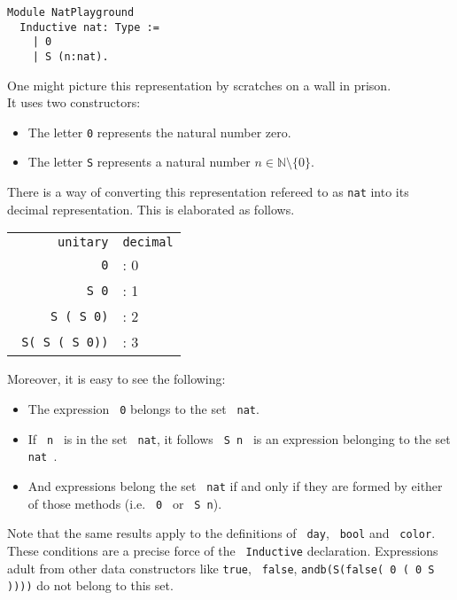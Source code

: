   \begin{lstlisting}[caption={\lstinline!nat!}, label=lst:DefNat]
  Module NatPlayground
  Inductive nat: Type :=
    | 0
    | S (n:nat).
  \end{lstlisting}  
  One might picture this representation by scratches on a wall in prison. \\
  It uses two constructors: 
  \begin{itemize}
  \item The letter \lstinline!0! represents the natural number zero. 
  \item The letter \lstinline!S! represents a natural number $n\in\mathbb{N}\setminus\{ 0\}$.  
  \end{itemize}
  There is a way of converting this representation refereed to as \lstinline!nat! into its decimal representation. This is elaborated as follows.
  \begin{example}
  
	  \begin{tabular} {r l}
	  
		  \texttt{unitary}				& \texttt{decimal}	\\
		  \texttt{\lstinline!0!} 		&: 0 				\\
		  \texttt{\lstinline! S 0!}  	&: 1				\\
		  \texttt{\lstinline! S ( S 0)!}	&: 2				\\
		  \texttt{\lstinline! S( S ( S 0))!}	&: 3				\\
		    
	  \end{tabular}
  \end{example}
  Moreover, it is easy to see the following: 
  \begin{itemize}
  \item The expression \lstinline! 0! belongs to the set \lstinline! nat!.
  \item If \lstinline! n ! is in the set \lstinline! nat!, it follows \lstinline! S n ! is an expression belonging to the set \lstinline! nat !.
  \item And expressions belong the set \lstinline! nat! if and only if they are  formed by either of those methods (i.e. \lstinline! 0 ! or  \lstinline! S n!). 
  \end{itemize}  
  Note that the same results apply to the definitions of \lstinline! day!, \lstinline! bool! and \lstinline! color!.
  These conditions are a precise force of the \lstinline! Inductive! declaration. 
  Expressions adult from other data constructors like \lstinline!true!, \lstinline! false!, \lstinline!andb(S(false( 0 ( 0 S ))))! do not belong to this set.  

